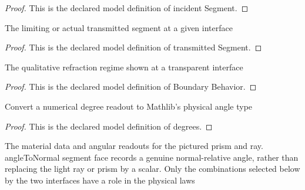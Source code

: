 \begin{proof}
  This is the declared model definition of incident Segment.
\end{proof}
\begin{definition}
  \label{def:physics:phyx-mini-0097:phyxminiproblems-problemphyxmini0097-prisminterface-transmittedsegment}
  The limiting or actual transmitted segment at a given interface
\end{definition}
\begin{proof}
  This is the declared model definition of transmitted Segment.
\end{proof}
\begin{definition}
  \label{def:physics:phyx-mini-0097:phyxminiproblems-problemphyxmini0097-boundarybehavior}
  The qualitative refraction regime shown at a transparent interface
\end{definition}
\begin{proof}
  This is the declared model definition of Boundary Behavior.
\end{proof}
\begin{definition}[degrees]
  \label{def:physics:phyx-mini-0097:phyxminiproblems-problemphyxmini0097-degrees}
  Convert a numerical degree readout to Mathlib's physical angle type
\end{definition}
\begin{proof}
  This is the declared model definition of degrees.
\end{proof}
\begin{definition}
  \label{def:physics:phyx-mini-0097:phyxminiproblems-problemphyxmini0097-rightangleprismraysetup}
  The material data and angular readouts for the pictured prism and ray. angleToNormal segment face records a genuine normal-relative angle, rather than replacing the light ray or prism by a scalar. Only the combinations selected below by the two interfaces have a role in the physical laws
\end{definition}
